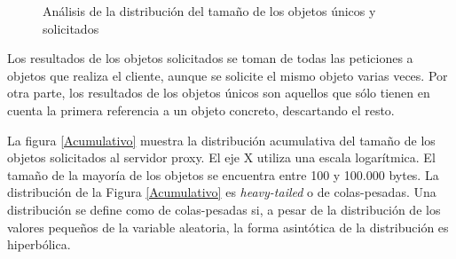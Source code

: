 \documentclass[twocolumn,twoside]{Jornadas}
\begin{document}
\begin{figure}[ht!]
\centering
{}
\caption{Análisis de la distribución del tamaño de los objetos únicos y solicitados}
\label{fig:tamObjetos}
\end{figure}

Los resultados de los objetos solicitados se toman de todas las peticiones a objetos que realiza el cliente, aunque se solicite el mismo objeto varias veces. Por otra parte, los resultados de los objetos únicos son aquellos que sólo tienen en cuenta la primera referencia a un objeto concreto, descartando el resto.

La figura \ref{Acumulativo} muestra la distribución acumulativa del tamaño de los objetos solicitados al servidor proxy. El eje X utiliza una escala logarítmica. El tamaño de la mayoría de los objetos se encuentra entre 100 y 100.000 bytes. La distribución de la Figura \ref{Acumulativo} es \emph{heavy-tailed} o de colas-pesadas. Una distribución se define como de colas-pesadas si, a pesar de la distribución de los valores pequeños de la variable aleatoria, la forma asintótica de la distribución es hiperbólica. %
\end{document}
